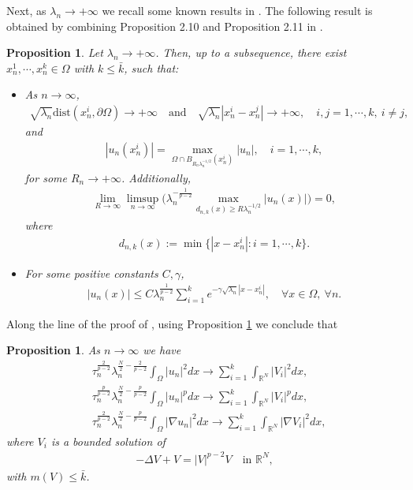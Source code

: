 \documentclass[10pt,a4paper]{article}
\newtheorem{proposition}[theorem]{Proposition}
\theoremstyle{definition} \theoremstyle{remark}
\numberwithin{equation}{section}
\newcommand{\R}{\mathbb{R}}
\newcommand{\la}{\lambda}
\newcommand{\ga}{\gamma}
\begin{document}
Next, as $\la_n \to +\infty$ we recall some known results in \cite{PV}. The following result is obtained by combining Proposition 2.10 and Proposition 2.11 in \cite{PV}.

\begin{proposition} \label{proplan}
	Let $\la_n \to +\infty$. Then, up to a subsequence, there exist $x_n^1, \cdots, x_n^k \in \Omega$ with $k \le \bar k$, such that:
	\begin{itemize}
		\item[(1)] As $n \to \infty$,
		\begin{align}
			\sqrt{\la_n}\text{dist}(x_n^i,\partial \Omega) \to +\infty \quad \text{and} \quad \sqrt{\la_n}|x_n^i - x_n^j| \to +\infty, \quad i,j = 1,\cdots,k, \ i \neq j,
		\end{align}
	    and
	    \begin{align}
	    	|u_n(x_n^i)| = \max_{\Omega \cap B_{R_n\la_n^{-1/2}}(x_n^i)}|u_n|, \quad i = 1,\cdots,k,
	    \end{align}
        for some $R_n \to +\infty$. Additionally,
        \begin{align}
        	\lim_{R \to \infty} \limsup_{n \to \infty}\biggl( \la_n^{-\frac{1}{p-2}} \max_{d_{n,k}(x) \ge R \la_n^{-1/2}}|u_n(x)| \biggr) = 0,
        \end{align}
        where
        \begin{align*}
        	d_{n,k}(x) := \min\bigl\{ |x - x_n^i|: i = 1,\cdots,k\bigr\}.
        \end{align*}
        \item[(2)] For some positive constants $C, \ga$,
        \begin{align}
        	|u_n(x)| \le C \la_n^{\frac{1}{p-2}} \sum_{i =1}^k e^{-\ga \sqrt{\la_n}|x - x_n^i|}, \quad \forall x \in \Omega, \ \forall n.       	
        \end{align}
	\end{itemize}
\end{proposition}

Along the line of the proof of \cite[Proposition 2.14]{PV}, using Proposition \ref{proplan} we conclude that

\begin{proposition} \label{propasm}
	As $n \to \infty$ we have
	\begin{align}
		& \tau_n^{\frac{2}{p-2}}\la_n^{\frac{N}{2} - \frac{2}{p-2}} \int_\Omega |u_n|^2dx \to \sum_{i = 1}^{k}\int_{\R^N} |V_i|^2dx, \label{eqntoinftyun2} \\
		& \tau_n^{\frac{p}{p-2}}\la_n^{\frac{N}{2} - \frac{p}{p-2}} \int_\Omega |u_n|^pdx \to \sum_{i = 1}^{k}\int_{\R^N} |V_i|^pdx, \\
		& \tau_n^{\frac{2}{p-2}}\la_n^{\frac{N}{2} - \frac{p}{p-2}}\int_\Omega |\nabla u_n|^2dx \to \sum_{i = 1}^{k}\int_{\R^N} |\nabla V_i|^2dx,
	\end{align}
    where $V_i$ is a bounded solution of
    \begin{align} \label{equationV}
    	-\Delta V + V = |V|^{p-2}V \quad \text{in } \R^N,
    \end{align}
    with $m(V) \leq \bar k$.
\end{proposition}
\end{document}
